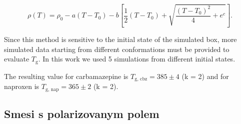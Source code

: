 \begin{equation}\label{eq:fit}
	\rho(T)=\rho_0-a\left(T-T_0\right)-b\left[\frac{1}{2}\left(T-T_0\right)+\sqrt{\frac{\left(T-T_0\right)^2}{4}+e^c}\right].
\end{equation}

Since this method is sensitive to the initial state of the simulated box, more simulated data starting from different conformations must be provided to evaluate $T_\text{g}$. In this work we used 5 simulations from different initial states.

The resulting value for carbamazepine is $T_{\text{g, cbz}} = 385 \pm 4$ (k = 2) and for naproxen is $T_{\text{g, nap}} = 365 \pm 2$ (k = 2). 

\subsection{Smesi s polarizovanym polem}